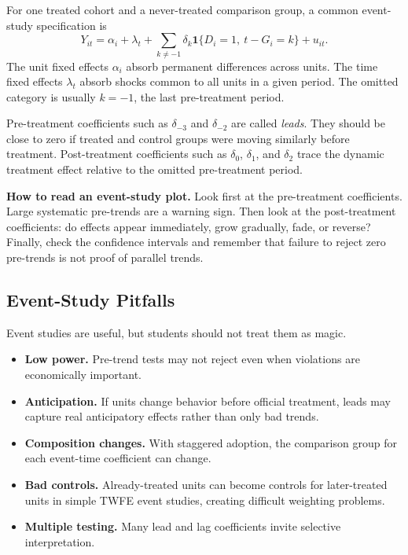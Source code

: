For one treated cohort and a never-treated comparison group, a common event-study
specification is
\[
    Y_{it}
    =
    \alpha_i+\lambda_t+
    \sum_{k\neq -1}\delta_k
    \mathbf{1}\{D_i=1,\ t-G_i=k\}
    +u_{it}.
\]
The unit fixed effects $\alpha_i$ absorb permanent differences across units. The
time fixed effects $\lambda_t$ absorb shocks common to all units in a given
period. The omitted category is usually $k=-1$, the last pre-treatment period.

Pre-treatment coefficients such as $\delta_{-3}$ and $\delta_{-2}$ are called
\emph{leads}. They should be close to zero if treated and control groups were
moving similarly before treatment. Post-treatment coefficients such as
$\delta_0$, $\delta_1$, and $\delta_2$ trace the dynamic treatment effect
relative to the omitted pre-treatment period.

\begin{boxD}
\textbf{How to read an event-study plot.} Look first at the pre-treatment
coefficients. Large systematic pre-trends are a warning sign. Then look at the
post-treatment coefficients: do effects appear immediately, grow gradually,
fade, or reverse? Finally, check the confidence intervals and remember that
failure to reject zero pre-trends is not proof of parallel trends.
\end{boxD}

\subsection{Event-Study Pitfalls}

Event studies are useful, but students should not treat them as magic.
\begin{itemize}
    \item \textbf{Low power.} Pre-trend tests may not reject even when violations
    are economically important.
    \item \textbf{Anticipation.} If units change behavior before official
    treatment, leads may capture real anticipatory effects rather than only bad
    trends.
    \item \textbf{Composition changes.} With staggered adoption, the comparison
    group for each event-time coefficient can change.
    \item \textbf{Bad controls.} Already-treated units can become controls for
    later-treated units in simple TWFE event studies, creating difficult
    weighting problems.
    \item \textbf{Multiple testing.} Many lead and lag coefficients invite
    selective interpretation.
\end{itemize}

